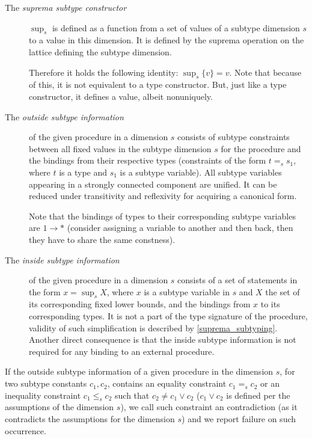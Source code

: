 \begin{description}
    \item[The \emph{suprema subtype constructor}] $\sup_s$ is defined as a function from a set of values of a subtype dimension $s$ to a value in this dimension. It is defined by the suprema operation on the lattice defining the subtype dimension.

    Therefore it holds the following identity: $\sup_s \{v\} = v$. Note that because of this, it is not equivalent to a type constructor. But, just like a type constructor, it defines a value, albeit nonuniquely.

    \item[The \emph{outside subtype information}] of the given procedure in a dimension $s$ consists of subtype constraints between all fixed values in the subtype dimension $s$ for the procedure and the bindings from their respective types (constraints of the form $t =_s s_1$, where $t$ is a type and $s_1$ is a subtype variable). All subtype variables appearing in a strongly connected component are unified. It can be reduced under transitivity and reflexivity for acquiring a canonical form.

    Note that the bindings of types to their corresponding subtype variables are $1 \to \ast$ (consider assigning a variable to another and then back, then they have to share the same constness).

    \item[The \emph{inside subtype information}] of the given procedure in a dimension $s$ consists of a set of statements in the form $x = \sup_s X$, where $x$ is a subtype variable in $s$ and $X$ the set of its corresponding fixed lower bounds, and the bindings from $x$ to its corresponding types. It is not a part of the type signature of the procedure, validity of such simplification is described by \cref{suprema_subtyping}. Another direct consequence is that the inside subtype information is not required for any binding to an external procedure.
\end{description}

\begin{remark}
    \label{def:contra}
    If the outside subtype information of a given procedure in the dimension $s$, for two subtype constants $c_1, c_2$, contains an equality constraint $c_1 =_s c_2$ or an inequality constraint $c_1 \leq_s c_2$ such that $c_2 \neq c_1 \lor c_2$ ($c_1 \lor c_2$ is defined per the assumptions of the dimension $s$), we call such constraint an contradiction (as it contradicts the assumptions for the dimension $s$) and we report failure on such occurrence.
\end{remark}

